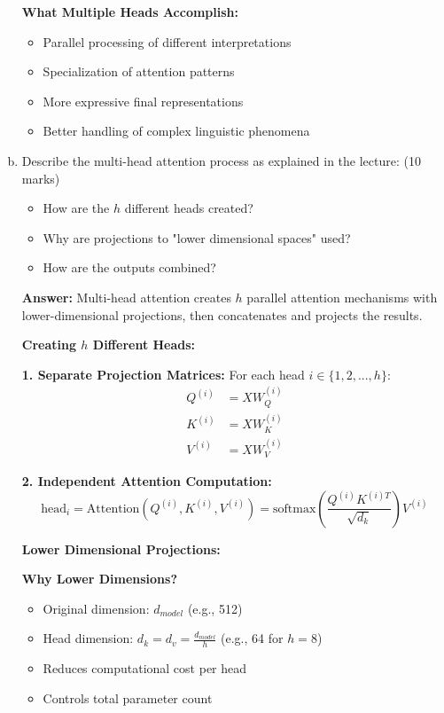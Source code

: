 \documentclass[12pt]{article}
\newcommand{\answer}[1]{{\color{answercolor}\textbf{Answer:} #1}}
\newcommand{\explanation}[1]{{\color{explanationcolor}#1}}
\begin{document}
\begin{enumerate}[(a)]
{    \textbf{What Multiple Heads Accomplish:}
    \begin{itemize}
        \item Parallel processing of different interpretations
        \item Specialization of attention patterns
        \item More expressive final representations
        \item Better handling of complex linguistic phenomena
    \end{itemize}
    }
    
    \item Describe the multi-head attention process as explained in the lecture: \hfill (10 marks)
    \begin{itemize}
        \item How are the $h$ different heads created?
        \item Why are projections to "lower dimensional spaces" used?
        \item How are the outputs combined?
    \end{itemize}
    
    \answer{Multi-head attention creates $h$ parallel attention mechanisms with lower-dimensional projections, then concatenates and projects the results.}
    
    \explanation{
    \textbf{Creating $h$ Different Heads:}
    
    \textbf{1. Separate Projection Matrices:}
    For each head $i \in \{1, 2, ..., h\}$:
    \begin{align}
        Q^{(i)} &= XW_Q^{(i)} \\
        K^{(i)} &= XW_K^{(i)} \\
        V^{(i)} &= XW_V^{(i)}
    \end{align}
    
    \textbf{2. Independent Attention Computation:}
    $$\text{head}_i = \text{Attention}(Q^{(i)}, K^{(i)}, V^{(i)}) = \text{softmax}\left(\frac{Q^{(i)}K^{(i)T}}{\sqrt{d_k}}\right)V^{(i)}$$
    
    \textbf{Lower Dimensional Projections:}
    
    \textbf{Why Lower Dimensions?}
    \begin{itemize}
        \item Original dimension: $d_{model}$ (e.g., 512)
        \item Head dimension: $d_k = d_v = \frac{d_{model}}{h}$ (e.g., 64 for $h=8$)
        \item Reduces computational cost per head
        \item Controls total parameter count
    \end{itemize}
    
}
\end{enumerate}
\end{document}

